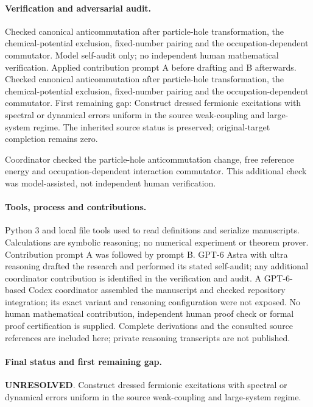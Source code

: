 \documentclass[11pt]{article}
\begin{document}
\paragraph{Verification and adversarial audit.}
Checked canonical anticommutation after particle-hole transformation, the chemical-potential exclusion, fixed-number pairing and the occupation-dependent commutator. Model self-audit only; no independent human mathematical verification. Applied contribution prompt A before drafting and B afterwards. Checked canonical anticommutation after particle-hole transformation, the chemical-potential exclusion, fixed-number pairing and the occupation-dependent commutator. First remaining gap: Construct dressed fermionic excitations with spectral or dynamical errors uniform in the source weak-coupling and large-system regime. The inherited source status is preserved; original-target completion remains zero.

Coordinator checked the particle-hole anticommutation change, free reference energy and occupation-dependent interaction commutator. This additional check was model-assisted, not independent human verification.

\paragraph{Tools, process and contributions.}
Python 3 and local file tools used to read definitions and serialize manuscripts. Calculations are symbolic reasoning; no numerical experiment or theorem prover. Contribution prompt A was followed by prompt B. GPT-6 Astra with ultra reasoning drafted the research and performed its stated self-audit; any additional coordinator contribution is identified in the verification and audit. A GPT-6-based Codex coordinator assembled the manuscript and checked repository integration; its exact variant and reasoning configuration were not exposed. No human mathematical contribution, independent human proof check or formal proof certification is supplied. Complete derivations and the consulted source references are included here; private reasoning transcripts are not published.

\paragraph{Final status and first remaining gap.}
\textbf{UNRESOLVED}. Construct dressed fermionic excitations with spectral or dynamical errors uniform in the source weak-coupling and large-system regime.
\end{document}
